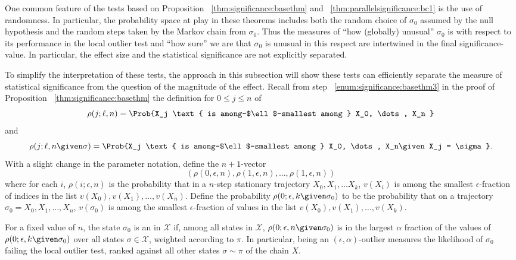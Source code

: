 \documentclass[12pt]{article}
\begin{document}
\begin{remark}
    One common feature of the tests based on Proposition~%
    \ref{thm:significance:basethm} and~%
    \ref{thm:parallelsignificance:bc1} is the use of randomness.  In particular,
    the probability space at play in these theorems includes both the
    random choice of \( \sigma_0 \) assumed by the null hypothesis and
    the random steps taken by the Markov chain from \( \sigma_0 \).
    Thus the measures of ``how (globally) unusual'' \( \sigma_0 \) is
    with respect to its performance in the local outlier test and ``how
    sure'' we are that \( \sigma_0 \) is unusual in this respect are
    intertwined in the final significance-value.  In particular, the effect
    size and the statistical significance are not explicitly separated.
\end{remark}

To simplify the interpretation of these tests, the approach in this
subsection will show these tests can efficiently separate the measure of
statistical significance from the question of the magnitude of the
effect.  Recall from step~%
\ref{enum:significance:basethm3} in the proof of
Proposition~%
\ref{thm:significance:basethm} the definition for \( 0 \le j \le n \) of
\[
    \rho(j; \ell, n) = \Prob{X_j \text{ is among-$\ell$-smallest
    among } X_0, \dots, X_n }
\] and
\[
  \rho(j; \ell, n \given \sigma) = \Prob{X_j
    \text{ is among-$\ell$-smallest among } X_0, \dots, X_n%
    \given X_j = \sigma }.
\] With a slight change in the parameter notation, define the \( n+1 \)-vector
\[ (\rho(0, \epsilon, n), \rho(1, \epsilon, n), \dots, \rho(1, \epsilon,
  n)) \]
where for each \( i \), \( \rho(i; \epsilon, n) \) is the
probability that in a \( n \)-step stationary trajectory \( X_0, X_1,
\dots X_k \), \( v(X_i) \) is among the smallest \( \epsilon
\)-fraction of indices
in the list \( v(X_0), v(X_1), \dots, v(X_n) \).  Define the probability
\( \rho(0; \epsilon, k \given \sigma_0) \) to be the probability that on a
trajectory \( \sigma_0 = X_0, X_1, \dots, X_n \), \( v(\sigma_0) \) is
among the smallest \( \epsilon \)-fraction of values in the list \( v(X_0),
v(X_1), \dots, v(X_k) \).

\begin{definition}
    For a fixed value of \( n \), the state \( \sigma_0 \) is an  in \( \mathcal{X} \) if, among all
    states in \( \mathcal{X} \), \( \rho(0; \epsilon, n \given \sigma_{0})
    \) is in the largest \( \alpha \) fraction of the values of \( \rho(0;
    \epsilon, k \given \sigma_{0}) \) over all states \( \sigma \in
    \mathcal{X} \), weighted according to \( \pi \).  In particular,
    being an \( (\epsilon, \alpha) \)-outlier measures the likelihood of
    \( \sigma_0 \) failing the local outlier test, ranked against all
    other states \( \sigma \sim \pi \) of the chain \( X \).
\end{definition}
\end{document}
